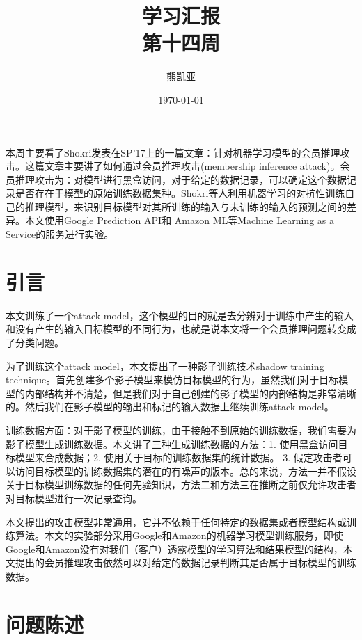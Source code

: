 \documentclass[a4paper]{article}
\title{学习汇报\\第十四周}
\author{熊凯亚}
\date{\today}
\begin{document}
\maketitle
本周主要看了Shokri发表在SP'17上的一篇文章：针对机器学习模型的会员推理攻击\cite{shokri2017membership}。这篇文章主要讲了如何通过会员推理攻击(membership inference attack)。会员推理攻击为：对模型进行黑盒访问，对于给定的数据记录，可以确定这个数据记录是否存在于模型的原始训练数据集种。Shokri等人利用机器学习的对抗性训练自己的推理模型，来识别目标模型对其所训练的输入与未训练的输入的预测之间的差异。本文使用Google Prediction API和 Amazon ML等Machine Learning as a Service的服务进行实验。

\section{引言}
本文训练了一个attack model，这个模型的目的就是去分辨对于训练中产生的输入和没有产生的输入目标模型的不同行为，也就是说本文将一个会员推理问题转变成了分类问题。

为了训练这个attack model，本文提出了一种影子训练技术shadow training technique。首先创建多个影子模型来模仿目标模型的行为，虽然我们对于目标模型的内部结构并不清楚，但是我们对于自己创建的影子模型的内部结构是非常清晰的。然后我们在影子模型的输出和标记的输入数据上继续训练attack model。

训练数据方面：对于影子模型的训练，由于接触不到原始的训练数据，我们需要为影子模型生成训练数据。本文讲了三种生成训练数据的方法：1. 使用黑盒访问目标模型来合成数据；2. 使用关于目标的训练数据集的统计数据。 3. 假定攻击者可以访问目标模型的训练数据集的潜在的有噪声的版本。总的来说，方法一并不假设关于目标模型训练数据的任何先验知识，方法二和方法三在推断之前仅允许攻击者对目标模型进行一次记录查询。

本文提出的攻击模型非常通用，它并不依赖于任何特定的数据集或者模型结构或训练算法。本文的实验部分采用Google和Amazon的机器学习模型训练服务，即使Google和Amazon没有对我们（客户）透露模型的学习算法和结果模型的结构，本文提出的会员推理攻击依然可以对给定的数据记录判断其是否属于目标模型的训练数据。


\section{问题陈述}
\end{document}
